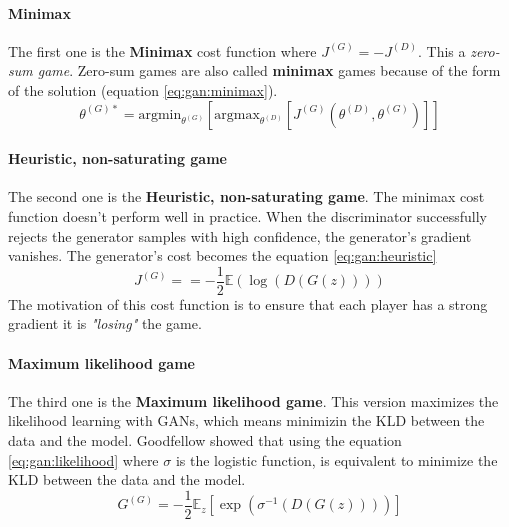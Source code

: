 \documentclass[12pt]{report}
\begin{document}
\paragraph{Minimax}

The first one is the \textbf{Minimax} cost function where $J^{(G)} = - J^{(D)}$.
This a \textit{zero-sum game}.
Zero-sum games are also called \textbf{minimax} games because of the form of the solution (equation \ref{eq:gan:minimax}).
\begin{equation}
    \theta^{(G)*} = \text{argmin}_{\theta^{(G)}} \left[ \text{argmax}_{\theta^{(D)}} \left[ J^{(G)} \left( \theta^{(D)}, \theta^{(G)} \right) \right] \right]
    \label{eq:gan:minimax}
\end{equation}

\paragraph{Heuristic, non-saturating game}

The second one is the \textbf{Heuristic, non-saturating game}.
The minimax cost function doesn't perform well in practice.
When the discriminator successfully rejects the generator samples with high confidence, the generator's gradient vanishes.
The generator's cost becomes the equation \ref{eq:gan:heuristic}
\begin{equation}
    J^{(G)} = = - \frac{1}{2} \mathbb{E} (\log(D(G(z))))
    \label{eq:gan:heuristic}
\end{equation}
The motivation of this cost function is to ensure that each player has a strong gradient it is \textit{"losing"} the game.

\paragraph{Maximum likelihood game}

The third one is the \textbf{Maximum likelihood game}.
This version maximizes the likelihood learning with GANs, which means minimizin the KLD between the data and the model.
Goodfellow \cite{goodfellow_generative_2014} showed that using the equation \ref{eq:gan:likelihood} where $\sigma$ is the logistic function, is equivalent to minimize the KLD between the data and the model.
\begin{equation}
    G^{(G)} = - \frac{1}{2} \mathbb{E}_{z} \left[ \exp \left( \sigma^{-1} (D(G(z))) \right) \right]
    \label{eq:gan:likelihood}
\end{equation}
\end{document}
